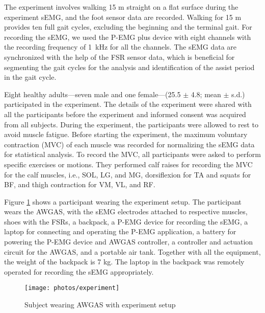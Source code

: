 \documentclass[paper,JRM,paper]{jaciiiarticle}
\begin{document}
The experiment involves walking 15 m straight on a flat surface during the experiment sEMG, and the foot sensor data are recorded. Walking for 15 m provides ten full gait cycles, excluding the beginning and the terminal gait.  For recording the sEMG, we used the P-EMG plus device with eight channels with the recording frequency of \SI{1}{\kilo\hertz} for all the channels. The sEMG data are synchronized with the help of the FSR sensor data, which is beneficial for segmenting the gait cycles for the analysis and identification of the assist period in the gait cycle. 

Eight healthy adults---seven male and one female---(25.5 $\pm$ 4.8; mean $\pm$ s.d.) participated in the experiment. The details of the experiment were shared with all the participants before the experiment  and informed consent was acquired from all subjects. During the experiment, the participants were allowed to rest to avoid muscle fatigue. Before starting the experiment, the maximum voluntary contraction (MVC) of each muscle was recorded for normalizing the sEMG data for statistical analysis. To record the MVC, all participants were asked to perform specific exercises or motions. They performed calf raises for recording the MVC for the calf muscles, i.e., SOL, LG, and MG, dorsiflexion for TA and squats for BF, and thigh contraction for VM, VL, and RF.

Figure \ref{fig:experiment} shows a participant wearing the experiment setup. The participant wears the AWGAS, with the sEMG electrodes attached to respective muscles, shoes with the FSRs, a backpack, a P-EMG device for recording the sEMG, a laptop for connecting and operating the P-EMG application, a battery for powering the P-EMG device and AWGAS controller, a controller and actuation circuit for the AWGAS, and a portable air tank. Together with all the equipment, the weight of the backpack is 7 kg. The laptop in the backpack was remotely operated for recording the sEMG appropriately.


\begin{figure}[h]
	\centering
	\texttt{[image: photos/experiment]}
	\caption{Subject wearing AWGAS with experiment setup}
	\label{fig:experiment}
\end{figure}
\end{document}
